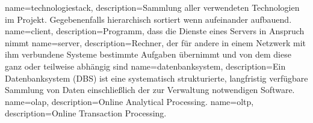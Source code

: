 {
  name=technologiestack,
  description={Sammlung aller verwendeten Technologien im Projekt. Gegebenenfalls hierarchisch sortiert wenn aufeinander aufbauend.}
}
{
  name=client,
  description={Programm, dass die Dienste eines Servers in Anspruch nimmt}
}
{
  name=server,
  description={Rechner, der für andere in einem Netzwerk mit ihm verbundene Systeme bestimmte Aufgaben übernimmt und von dem diese ganz oder teilweise abhängig sind}
}
{
  name=datenbanksystem,
  description={Ein Datenbanksystem (DBS) ist eine systematisch strukturierte, langfristig verfügbare Sammlung von Daten einschließlich der zur Verwaltung notwendigen Software.}
}
{
  name=olap,
  description={Online Analytical Processing.}
}
{
  name=oltp,
  description={Online Transaction Processing.}
}


\renewcommand*{\glossaryname}{\section{\glossarName}}

\glsaddall
\printglossaries

